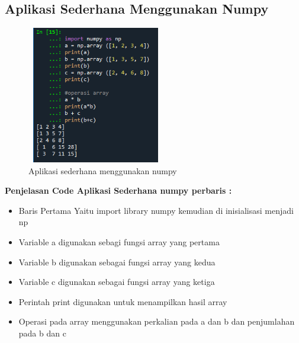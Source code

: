 \subsection{Aplikasi Sederhana Menggunakan Numpy} 
\begin{figure}[!htbp]
    \centering
    \includegraphics[width=6cm,height=6cm]{figures/aplikasi_numpy.png}
    \caption{Aplikasi sederhana menggunakan numpy}
    \label{penanda}
\end{figure}
    \textbf{Penjelasan Code Aplikasi Sederhana numpy perbaris :}
    \begin{itemize}
    \item Baris Pertama Yaitu import library numpy kemudian di inisialisasi menjadi np
    \item Variable a digunakan sebagi fungsi array yang pertama
    \item Variable b digunakan sebagai fungsi array yang kedua
    \item Variable c digunakan sebagai fungsi array yang ketiga
    \item Perintah print digunakan untuk menampilkan hasil array
    \item Operasi pada array menggunakan perkalian pada a dan b dan penjumlahan pada b dan c
    \end{itemize}


